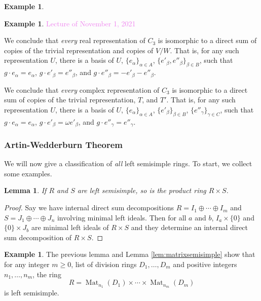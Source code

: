 \documentclass{amsart}[12pt]
\def\Mat{\operatorname{Mat}}
\newcommand{\Nov}[1]{\textcolor{violet}{Lecture of November #1, 2021}}
\newcommand{\R}{{\mathbb{R}}}
\newcommand{\C}{\mathbb{C}}
\numberwithin{equation}{section}
\theoremstyle{plain} %
\newtheorem{lem}[equation]{Lemma}
\theoremstyle{definition}
\newtheorem{ex}[equation]{Example}
\theoremstyle{remark}
\newcommand{\sssec}[1]{\subsubsection{#1}}
\begin{document}
\begin{ex}
\begin{ex}
              
              \Nov{1}    
                         
                   We conclude that \emph{every} real representation of $C_3$ is isomorphic to a direct sum of copies of the trivial representation and copies of $V/W$. That is, for any such representation $U$, there is a basis of $U$, $\{e_\alpha \}_{\alpha\in A}$, $\{e'_\beta, e''_\beta\}_{\beta\in B}$, such that $g\cdot e_\alpha = e_\alpha$, $g\cdot e'_\beta = e''_\beta$, and $g\cdot e''_\beta = - e'_\beta - e''_\beta$.


We conclude that \emph{every} complex representation of $C_3$ is isomorphic to a direct sum of copies of the trivial representation, $T$, and $T'$. That is, for any such representation $U$, there is a basis of $U$, $\{e_\alpha \}_{\alpha\in A}$, $\{e'_\beta\}_{\beta\in B}$, $\{e''_\gamma\}_{\gamma\in C}$, such that $g\cdot e_\alpha = e_\alpha$, $g\cdot e'_\beta = \omega e'_\beta$, and $g\cdot e''_\gamma = e''_\gamma$.
                         
             \end{ex}
             
\sssec{Artin-Wedderburn Theorem}

We will now give a classification of \emph{all} left semisimple rings. To start, we collect some examples.

\begin{lem} If $R$ and $S$ are left semisimple, so is the product ring $R \times S$.
\end{lem}

\begin{proof} Say we have internal direct sum decompositions
  $R = I_1 \oplus \cdots \oplus I_m$ and
  $S = J_1 \oplus \cdots \oplus J_n$ involving minimal left ideals. Then for all $a$ and $b$,
  $I_a \times \{0\}$ and $\{0\} \times J_b$ are minimal left ideals of $R \times S$
  and they determine an internal direct sum decomposition of $R \times S$. 
\end{proof}

\begin{ex}
The previous lemma and Lemma \ref{lem:matrixsemisimple} show that for any integer $m \geq 0$, list of division rings $D_1, \dots, D_m$ and positive integers $n_1, \dots, n_m$, the ring
  $$
  R =\Mat_{n_1}(D_1) \times \cdots \times \Mat_{n_m}(D_m)
  $$
  is left semisimple. \end{ex}


\end{ex}
\end{document}
